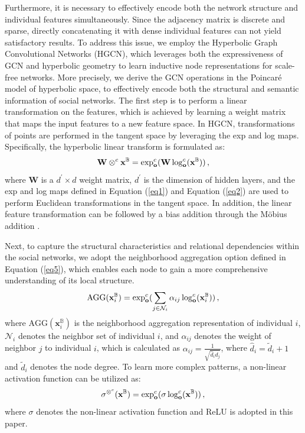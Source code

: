 \documentclass[twoside,leqno,twocolumn]{article}
\begin{document}
Furthermore, it is necessary to effectively encode both the network structure and individual features simultaneously. Since the adjacency matrix is discrete and sparse, directly concatenating it with dense individual features can not yield satisfactory results. To address this issue, we employ the Hyperbolic Graph Convolutional Networks (HGCN)\cite{yang2022hyperbolic,chami2019hyperbolic}, which leverages both the expressiveness of GCN and hyperbolic geometry to learn inductive node representations for scale-free networks. More precisely, we derive the GCN operations in the Poincar\'{e} model of hyperbolic space, to effectively encode both the structural and semantic information of social networks.
The first step is to perform a linear transformation on the features, which is achieved by learning a weight matrix that maps the input features to a new feature space. In HGCN, transformations of points are performed in the tangent space by leveraging the exp and log maps. Specifically, the hyperbolic linear transform is formulated as:
\begin{equation}
\vspace{-0.2em}
\label{eq4}
    \mathbf{W} \otimes^c \mathbf{x}^\mathbb{B}= {\exp}_\mathbf{o}^c(\mathbf{W}\log_\mathbf{o}^c(\mathbf{x}^\mathbb{B})) \,,
\end{equation}
where $\mathbf{W}$ is a $d^\prime \times d$ weight matrix, $d^\prime$ is the dimension of hidden layers, and the exp and log maps defined in Equation (\ref{eq1}) and Equation (\ref{eq2}) are used to perform Euclidean transformations in the tangent space.
 In addition, the linear feature transformation can be followed by a bias addition through the M{\"o}bius addition \cite{ganea2018hyperbolic}. 
 
 Next, to capture the structural characteristics and relational dependencies within the social networks, we adopt the neighborhood aggregation option defined in Equation (\ref{eq5}), which enables each node to gain a more comprehensive understanding of its local structure.
\begin{equation}
\vspace{-0.2em}
\label{eq5}
    \text{AGG}(\mathbf{x}^\mathbb{B}_i)=\exp_\mathbf{o}^c( \sum_{j\in \mathcal{N}_i }{\alpha_{ij}\log_\mathbf{o}^c(\mathbf{x}_i^\mathbb{B})}) \,,
\end{equation}
where $\text{AGG}(\mathbf{x}^\mathbb{B}_i)$ is the neighborhood aggregation representation of individual $i$, 
${\mathcal{N}_i}$ denotes the neighbor set of individual $i$, 
and $\alpha_{ij}$ denotes the weight of neighbor $j$ to individual $i$, which is calculated as $ \alpha_{ij}=\frac{1}{\sqrt{\hat d_i\hat d_j}}$, where $\hat d_i=\tilde d_i+1$ and $\tilde d_i$ denotes the node degree.
To learn more complex patterns, a non-linear activation function can be utilized as:
\begin{equation}
\vspace{-0.2em}
\label{eq6}
    \sigma^{\otimes ^{{c}}}(\mathbf{x}^\mathbb{B})=
    \exp_\mathbf{o}^{c}
    (\sigma \log_\mathbf{o}^{c}(\mathbf{x}^\mathbb{B})) \,,
\end{equation}
where $\sigma$ denotes the non-linear activation function and ReLU \cite{glorot2011deep} is adopted in this paper.
\end{document}
